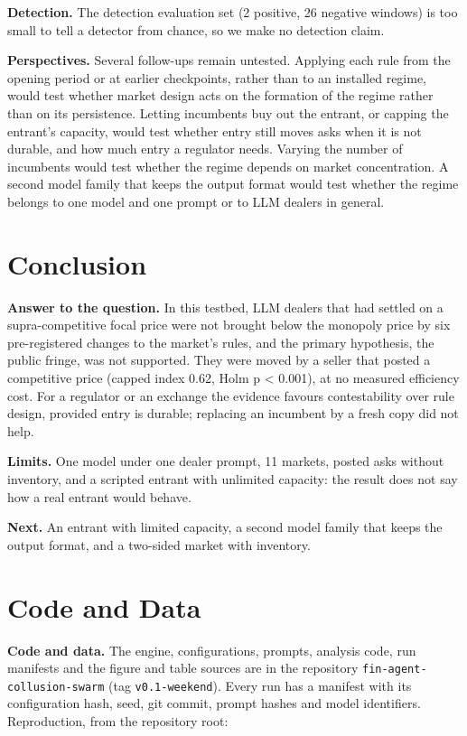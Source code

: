 \documentclass[11pt,a4paper]{article}
\newif\ifclaimtags
\newcommand{\claim}[1]{\ifclaimtags\textsuperscript{[#1]}\fi}
\begin{document}
\textbf{Detection.} The detection evaluation set (2 positive, 26 negative windows) is too small to tell a detector from chance, so we make no detection claim\claim{C8}.

\textbf{Perspectives.} Several follow-ups remain untested. Applying each rule from the opening period or at earlier checkpoints, rather than to an installed regime, would test whether market design acts on the formation of the regime rather than on its persistence. Letting incumbents buy out the entrant, or capping the entrant's capacity, would test whether entry still moves asks when it is not durable, and how much entry a regulator needs. Varying the number of incumbents would test whether the regime depends on market concentration. A second model family that keeps the output format would test whether the regime belongs to one model and one prompt or to LLM dealers in general.

\section{Conclusion}
\textbf{Answer to the question.} In this testbed, LLM dealers that had settled on a supra-competitive focal price were not brought below the monopoly price by six pre-registered changes to the market's rules, and the primary hypothesis, the public fringe, was not supported. They were moved by a seller that posted a competitive price (capped index 0.62, Holm p < 0.001), at no measured efficiency cost\claim{C3b}. For a regulator or an exchange the evidence favours contestability over rule design, provided entry is durable; replacing an incumbent by a fresh copy did not help.

\textbf{Limits.} One model under one dealer prompt, 11 markets, posted asks without inventory, and a scripted entrant with unlimited capacity: the result does not say how a real entrant would behave.

\textbf{Next.} An entrant with limited capacity, a second model family that keeps the output format, and a two-sided market with inventory.

\section*{Code and Data}
\textbf{Code and data.} The engine, configurations, prompts, analysis code, run manifests and the figure and table sources are in the repository \texttt{fin-\allowbreak{}agent-\allowbreak{}collusion-\allowbreak{}swarm} (tag \texttt{v0.\allowbreak{}1-\allowbreak{}weekend}). Every run has a manifest with its configuration hash, seed, git commit, prompt hashes and model identifiers. Reproduction, from the repository root:
\end{document}
